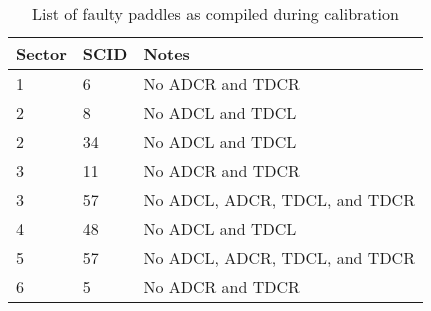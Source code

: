 \begin{table}
\begin{minipage}{\textwidth}
\begin{center}
\begin{singlespacing}

\caption{\label{tab:craigtof}List of faulty paddles as compiled during calibration}
    
\begin{tabular}{llp{}}

\hline \hline

Sector & SCID & Notes \\

\hline

1 & 6 & No ADCR and TDCR \\
2 & 8 & No ADCL and TDCL \\
2 & 34 & No ADCL and TDCL \\
3 & 11 & No ADCR and TDCR \\
3 & 57 & No ADCL, ADCR, TDCL, and TDCR \\
4 & 48 & No ADCL and TDCL \\
5 & 57 & No ADCL, ADCR, TDCL, and TDCR \\
6 & 5 & No ADCR and TDCR \\

\hline \hline

\end{tabular}

\end{singlespacing}
\end{center}
\end{minipage}
\end{table}
